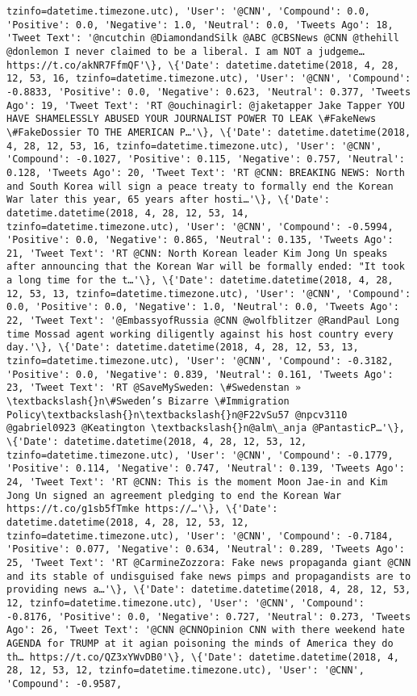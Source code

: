 \documentclass[11pt]{article}
\begin{document}
\begin{Verbatim}[commandchars=\\\{\}]
tzinfo=datetime.timezone.utc), 'User': '@CNN', 'Compound': 0.0, 'Positive': 0.0, 'Negative': 1.0, 'Neutral': 0.0, 'Tweets Ago': 18, 'Tweet Text': '@ncutchin @DiamondandSilk @ABC @CBSNews @CNN @thehill @donlemon I never claimed to be a liberal. I am NOT a judgeme… https://t.co/akNR7FfmQF'\}, \{'Date': datetime.datetime(2018, 4, 28, 12, 53, 16, tzinfo=datetime.timezone.utc), 'User': '@CNN', 'Compound': -0.8833, 'Positive': 0.0, 'Negative': 0.623, 'Neutral': 0.377, 'Tweets Ago': 19, 'Tweet Text': 'RT @ouchinagirl: @jaketapper Jake Tapper YOU HAVE SHAMELESSLY ABUSED YOUR JOURNALIST POWER TO LEAK \#FakeNews \#FakeDossier TO THE AMERICAN P…'\}, \{'Date': datetime.datetime(2018, 4, 28, 12, 53, 16, tzinfo=datetime.timezone.utc), 'User': '@CNN', 'Compound': -0.1027, 'Positive': 0.115, 'Negative': 0.757, 'Neutral': 0.128, 'Tweets Ago': 20, 'Tweet Text': 'RT @CNN: BREAKING NEWS: North and South Korea will sign a peace treaty to formally end the Korean War later this year, 65 years after hosti…'\}, \{'Date': datetime.datetime(2018, 4, 28, 12, 53, 14, tzinfo=datetime.timezone.utc), 'User': '@CNN', 'Compound': -0.5994, 'Positive': 0.0, 'Negative': 0.865, 'Neutral': 0.135, 'Tweets Ago': 21, 'Tweet Text': 'RT @CNN: North Korean leader Kim Jong Un speaks after announcing that the Korean War will be formally ended: "It took a long time for the t…'\}, \{'Date': datetime.datetime(2018, 4, 28, 12, 53, 13, tzinfo=datetime.timezone.utc), 'User': '@CNN', 'Compound': 0.0, 'Positive': 0.0, 'Negative': 1.0, 'Neutral': 0.0, 'Tweets Ago': 22, 'Tweet Text': '@EmbassyofRussia @CNN @wolfblitzer @RandPaul Long time Mossad agent working diligently against his host country every day.'\}, \{'Date': datetime.datetime(2018, 4, 28, 12, 53, 13, tzinfo=datetime.timezone.utc), 'User': '@CNN', 'Compound': -0.3182, 'Positive': 0.0, 'Negative': 0.839, 'Neutral': 0.161, 'Tweets Ago': 23, 'Tweet Text': 'RT @SaveMySweden: \#Swedenstan » \textbackslash{}n\#Sweden’s Bizarre \#Immigration Policy\textbackslash{}n\textbackslash{}n@F22vSu57 @npcv3110 @gabriel0923 @Keatington \textbackslash{}n@alm\_anja @PantasticP…'\}, \{'Date': datetime.datetime(2018, 4, 28, 12, 53, 12, tzinfo=datetime.timezone.utc), 'User': '@CNN', 'Compound': -0.1779, 'Positive': 0.114, 'Negative': 0.747, 'Neutral': 0.139, 'Tweets Ago': 24, 'Tweet Text': 'RT @CNN: This is the moment Moon Jae-in and Kim Jong Un signed an agreement pledging to end the Korean War https://t.co/g1sb5fTmke https://…'\}, \{'Date': datetime.datetime(2018, 4, 28, 12, 53, 12, tzinfo=datetime.timezone.utc), 'User': '@CNN', 'Compound': -0.7184, 'Positive': 0.077, 'Negative': 0.634, 'Neutral': 0.289, 'Tweets Ago': 25, 'Tweet Text': 'RT @CarmineZozzora: Fake news propaganda giant @CNN and its stable of undisguised fake news pimps and propagandists are to providing news a…'\}, \{'Date': datetime.datetime(2018, 4, 28, 12, 53, 12, tzinfo=datetime.timezone.utc), 'User': '@CNN', 'Compound': -0.8176, 'Positive': 0.0, 'Negative': 0.727, 'Neutral': 0.273, 'Tweets Ago': 26, 'Tweet Text': '@CNN @CNNOpinion CNN with there weekend hate AGENDA for TRUMP at it agian poisoning the minds of America they do th… https://t.co/QZ3xYWvDB0'\}, \{'Date': datetime.datetime(2018, 4, 28, 12, 53, 12, tzinfo=datetime.timezone.utc), 'User': '@CNN', 'Compound': -0.9587, 
\end{Verbatim}
\end{document}
